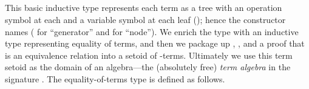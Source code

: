 \begin{code}%
\>[0]\<%
\\
\>[0]\AgdaSpace{}%
\AgdaSpace{}%
\AgdaSymbol{(}\AgdaSpace{}%
\AgdaSymbol{:}\AgdaSpace{}%
\AgdaSpace{}%
\AgdaSpace{}%
\AgdaSymbol{)}\AgdaSpace{}%
\AgdaSymbol{:}\AgdaSpace{}%
\AgdaSpace{}%
\AgdaSymbol{(}\AgdaSpace{}%
\AgdaSymbol{)}%
\>[39]\<%
\\
\>[0][@{}l@{\AgdaIndent{0}}]%
\>[1]\AgdaSpace{}%
\AgdaSymbol{:}\AgdaSpace{}%
\AgdaSpace{}%
\AgdaSpace{}%
\AgdaSpace{}%
\<%
\\
%
\>[1]\AgdaSpace{}%
\AgdaSymbol{:}\AgdaSpace{}%
\AgdaSymbol{(}\AgdaSpace{}%
\AgdaSymbol{:}\AgdaSpace{}%
\AgdaSpace{}%
\AgdaSpace{}%
\AgdaSymbol{)(}\AgdaSpace{}%
\AgdaSymbol{:}\AgdaSpace{}%
\AgdaSpace{}%
\AgdaSpace{}%
\AgdaSpace{}%
\AgdaSpace{}%
\AgdaSpace{}%
\AgdaSpace{}%
\AgdaSymbol{)}\AgdaSpace{}%
\AgdaSpace{}%
\AgdaSpace{}%
\<%
\\
\>[0]\<%
\end{code}
This basic inductive type represents each term as a tree with an operation symbol at each
 and a variable symbol at each leaf (); hence the constructor names
( for ``generator'' and  for ``node''). We enrich the  type with
an inductive type  representing equality of terms, and then we package
up , , and a proof that  is an equivalence
relation into a setoid of -terms. Ultimately we use this term setoid as the domain
of an algebra---the (absolutely free) \emph{term algebra} in the signature .
The equality-of-terms type is defined as follows.


